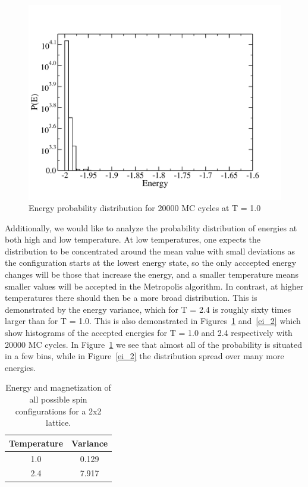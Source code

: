 \documentclass[prc,amsmath,twocolumn,superscriptaddress]{revtex4}
\begin{document}
\begin{figure}[t]
\includegraphics[scale=0.33]{ei_1.pdf}
\caption{Energy probability distribution for 20000 MC cycles at T = 1.0}
\label{ei_1}
\end{figure}

Additionally, we would like to analyze the probability distribution of energies at both high and low temperature. At low temperatures, one expects the distribution to be concentrated around the mean value with small deviations as the configuration starts at the lowest energy state, so the only acccepted energy changes will be those that increase the energy, and a smaller temperature means smaller values will be accepted in the Metropolis algorithm. In contrast, at higher temperatures there should then be a more broad distribution. This is demonstrated by the energy variance, which for T = 2.4 is roughly sixty times larger than for T = 1.0. This is also demonstrated in Figures~\ref{ei_1} and~\ref{ei_2} which show histograms of the accepted energies for T = 1.0 and 2.4 respectively with 20000 MC cycles. In Figure~\ref{ei_1} we see that almost all of the probability is situated in a few bins, while in Figure~\ref{ei_2} the distribution spread over many more energies.

\begin{table}[b]
\centering
\begin{tabular}{|c|c|}
\hline
Temperature & Variance\\
\hline
1.0 & 0.129 \\
2.4 & 7.917 \\
\hline
\end{tabular}
\caption{Energy and magnetization of all possible spin configurations for a 2x2 lattice.}
\label{cycles}
\end{table}
\end{document}
